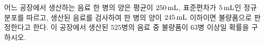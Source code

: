 어느 공장에서 생산하는 음료 한 병의 양은 평균이 $250\mkern3mu \mathrm{mL}$, 표준편차가 $5\mkern3mu \mathrm{mL}$인 정규분포를 따르고, 생산된 음료를 검사하여 한 병의 양이 $245\mkern3mu \mathrm{mL}$ 이하이면 불량품으로 판정한다고 한다. 이 공장에서 생산된 $525$병의 음료 중 불량품이 $63$병 이상일 확률을 구하시오. 
